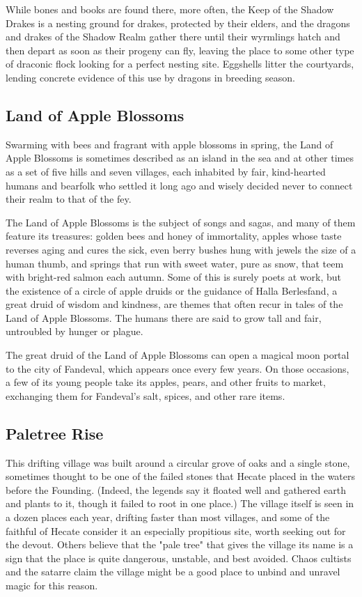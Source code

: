 \documentclass[10pt,a4paper,twoside,bg=print,twocolumn,openany,nodeprecatedcode]{dndbook}
\begin{document}
While bones and books are found there, more often, the Keep of the Shadow Drakes is a nesting ground for drakes, protected by their elders, and the dragons and drakes of the Shadow Realm gather there until their wyrmlings hatch and then depart as soon as their progeny can fly, leaving the place to some other type of draconic flock looking for a perfect nesting site. Eggshells litter the courtyards, lending concrete evidence of this use by dragons in breeding season.

\subsection{Land of Apple Blossoms}
Swarming with bees and fragrant with apple blossoms in spring, the Land of Apple Blossoms is sometimes described as an island in the sea and at other times as a set of five hills and seven villages, each inhabited by fair, kind-hearted humans and bearfolk who settled it long ago and wisely decided never to connect their realm to that of the fey.

The Land of Apple Blossoms is the subject of songs and sagas, and many of them feature its treasures: golden bees and honey of immortality, apples whose taste reverses aging and cures the sick, even berry bushes hung with jewels the size of a human thumb, and springs that run with sweet water, pure as snow, that teem with bright-red salmon each autumn. Some of this is surely poets at work, but the existence of a circle of apple druids or the guidance of Halla Berlesfand, a great druid of wisdom and kindness, are themes that often recur in tales of the Land of Apple Blossoms. The humans there are said to grow tall and fair, untroubled by hunger or plague.

The great druid of the Land of Apple Blossoms can open a magical moon portal to the city of Fandeval, which appears once every few years. On those occasions, a few of its young people take its apples, pears, and other fruits to market, exchanging them for Fandeval's salt, spices, and other rare items.

\subsection{Paletree Rise}
This drifting village was built around a circular grove of oaks and a single stone, sometimes thought to be one of the failed stones that Hecate placed in the waters before the Founding. (Indeed, the legends say it floated well and gathered earth and plants to it, though it failed to root in one place.) The village itself is seen in a dozen places each year, drifting faster than most villages, and some of the faithful of Hecate consider it an especially propitious site, worth seeking out for the devout. Others believe that the "pale tree" that gives the village its name is a sign that the place is quite dangerous, unstable, and best avoided. Chaos cultists and the satarre claim the village might be a good place to unbind and unravel magic for this reason.
\end{document}
